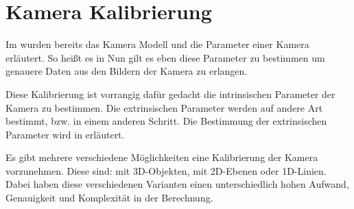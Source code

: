 \section{Kamera Kalibrierung}
\label{sec:camera}
Im  wurden bereits das Kamera Modell und die Parameter einer Kamera erläutert. So heißt es in \autocite[5]{Zhang2000}  Nun gilt es eben diese Parameter zu bestimmen um genauere Daten aus den Bildern der Kamera zu erlangen. 

Diese Kalibrierung ist vorrangig dafür gedacht die intrinsischen Parameter der Kamera zu bestimmen. Die extrinsischen Parameter werden auf andere Art bestimmt, bzw. in einem anderen Schritt. Die Bestimmung der extrinsischen Parameter wird in  erläutert.

Es gibt mehrere verschiedene Möglichkeiten eine Kalibrierung der Kamera vorzunehmen. Diese sind: mit 3D-Objekten, mit 2D-Ebenen oder 1D-Linien. Dabei haben diese verschiedenen Varianten einen unterschiedlich hohen Aufwand, Genauigkeit und Komplexität in der Berechnung. 

